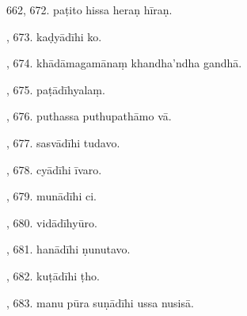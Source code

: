 662, 672. paṭito hissa heraṇ hīraṇ.\par {}, 673. kaḍyādīhi ko.\par {}, 674. khādāmagamānaṃ khandha’ndha gandhā.\par {}, 675. paṭādīhyalaṃ.\par {}, 676. puthassa puthupathāmo vā.\par {}, 677. sasvādīhi tudavo.\par {}, 678. cyādīhi īvaro.\par {}, 679. munādīhi ci.\par {}, 680. vidādīhyūro.\par {}, 681. hanādīhi ṇunutavo.\par {}, 682. kuṭādīhi ṭho.\par {}, 683. manu pūra suṇādīhi ussa nusisā.\par \noindent
